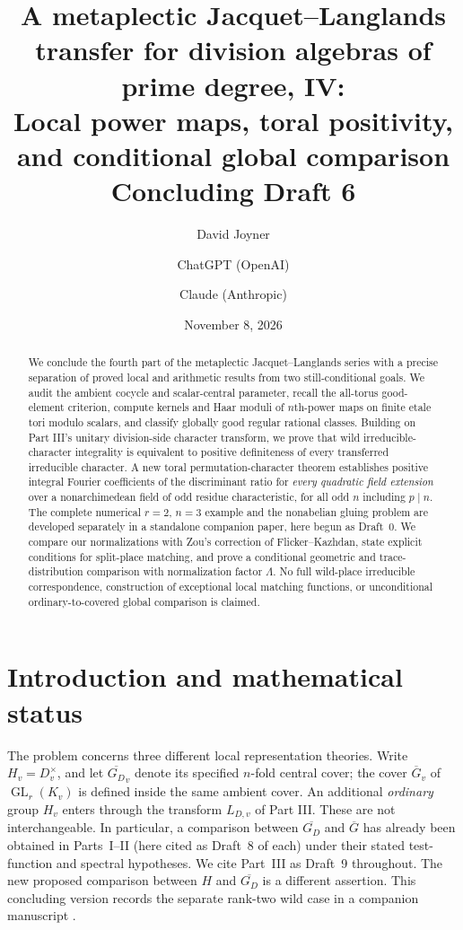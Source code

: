 \documentclass[11pt]{article}
\title{A metaplectic Jacquet--Langlands transfer for division algebras of prime degree, IV:\\
Local power maps, toral positivity, and conditional global comparison\\[0.4em]\normalsize Concluding Draft 6}
\author{David Joyner \and ChatGPT (OpenAI) \and Claude (Anthropic)}
\date{November 8, 2026}
\newcommand{\GL}{\operatorname{GL}}
\newcommand{\Gb}{\overline G}
\newcommand{\GDb}{\overline{G_D}}
\theoremstyle{plain}
\theoremstyle{definition}
\begin{document}
\maketitle
\begin{abstract}
We conclude the fourth part of the metaplectic Jacquet--Langlands
series with a precise separation of proved local and arithmetic
results from two still-conditional goals.  We audit the ambient
cocycle and scalar-central parameter, recall the all-torus
good-element criterion, compute kernels and Haar moduli of
$n$th-power maps on finite etale tori modulo scalars, and
classify globally good regular rational classes.  Building on
Part III's unitary division-side character transform, we prove
that wild irreducible-character integrality is equivalent to
positive definiteness of every transferred irreducible character.
A new toral permutation-character theorem establishes positive
integral Fourier coefficients of the discriminant ratio for
\emph{every quadratic field extension} over a nonarchimedean
field of odd residue characteristic, for all odd $n$ including
$p\mid n$.  The complete numerical $r=2$, $n=3$ example and the
nonabelian gluing problem are developed separately in a
standalone companion paper, here begun as Draft~0.  We compare
our normalizations with Zou's correction of Flicker--Kazhdan,
state explicit conditions for split-place matching, and prove
a conditional geometric and trace-distribution comparison with
normalization factor $\Lambda$.  No full wild-place irreducible
correspondence, construction of exceptional local matching
functions, or unconditional ordinary-to-covered global
comparison is claimed.
\end{abstract}
\tableofcontents

\section{Introduction and mathematical status}\label{sec:intro}
The problem concerns three different local representation theories.
Write $H_v=D_v^\times$, and let $\GDb_v$ denote its specified $n$-fold
central cover; the cover $\Gb_v$ of $\GL_r(K_v)$ is defined inside the
same ambient cover.  An additional \emph{ordinary} group $H_v$ enters
through the transform $L_{D,v}$ of Part III.  These are not interchangeable.
In particular, a comparison between $\GDb$ and $\Gb$ has already been
obtained in Parts~I--II (here cited as Draft~8 of each) under their
stated test-function and spectral hypotheses.  We cite Part~III
as Draft~9 throughout.  The new proposed comparison between $H$ and $\GDb$ is a
different assertion.  This concluding version records the separate
rank-two wild case in a companion manuscript \cite{RankTwo0}.
\end{document}
